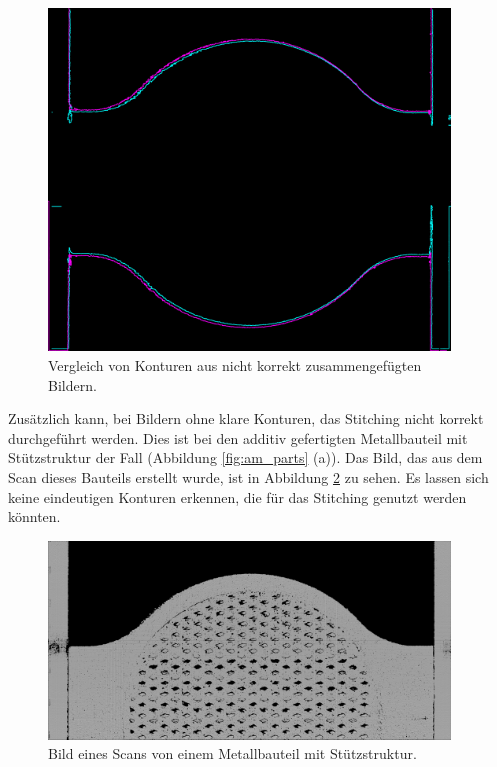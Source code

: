 \begin{figure}[H]
  \centering
  \includegraphics[width=0.95\textwidth]{images/contours_matching_36.png}
  \caption{Vergleich von Konturen aus nicht korrekt zusammengefügten Bildern.}
  \label{fig:errors}
\end{figure}

Zusätzlich kann, bei Bildern ohne klare Konturen, das Stitching nicht korrekt durchgeführt
werden. Dies ist bei den additiv gefertigten Metallbauteil mit Stützstruktur der Fall 
(Abbildung \ref{fig:am_parts} (a)). Das Bild, das aus dem Scan dieses Bauteils erstellt wurde, 
ist in Abbildung \ref{fig:errorimage} zu sehen. Es lassen sich keine eindeutigen Konturen 
erkennen, die für das Stitching genutzt werden könnten.

\begin{figure}[H]
  \centering
  \includegraphics[width=0.95\textwidth]{images/am0.png}
  \caption{Bild eines Scans von einem Metallbauteil mit Stützstruktur.}
  \label{fig:errorimage}
\end{figure}


